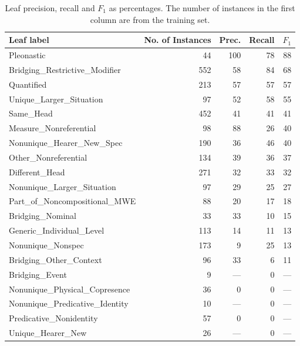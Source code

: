 \documentclass[11pt,letterpaper]{article}
\begin{document}
\begin{table*}\small\centering
   \begin{tabular}{lr<{\hspace{23pt}}r<{\hspace{3pt}}r<{\hspace{5pt}}r}
      \textbf{Leaf label} & \multicolumn{1}{c}{\textbf{No. of Instances}} & \multicolumn{1}{c}{\textbf{Prec.}} & \multicolumn{1}{c}{\textbf{Recall}} & \textbf{$F_1$} \\
      \midrule
Pleonastic & 44 & 100 & 78 & 88 \\
Bridging\_Restrictive\_Modifier & 552 & 58 & 84 & 68 \\
Quantified & 213 & 57 & 57 & 57 \\
Unique\_Larger\_Situation & 97 & 52 & 58 & 55 \\
Same\_Head & 452 & 41 & 41 & 41 \\
Measure\_Nonreferential & 98 & 88 & 26 & 40 \\
Nonunique\_Hearer\_New\_Spec & 190 & 36 & 46 & 40 \\
Other\_Nonreferential & 134 & 39 & 36 & 37 \\
Different\_Head & 271 & 32 & 33 & 32 \\
Nonunique\_Larger\_Situation & 97 & 29 & 25 & 27 \\
Part\_of\_Noncompositional\_MWE & 88 & 20 & 17 & 18 \\
Bridging\_Nominal & 33 & 33 & 10 & 15 \\
Generic\_Individual\_Level & 113 & 14 & 11 & 13 \\
Nonunique\_Nonspec & 173 & 9 & 25 & 13 \\
Bridging\_Other\_Context & 96 & 33 & 6 & 11 \\
Bridging\_Event & 9 & --- & 0 & --- \\
Nonunique\_Physical\_Copresence & 36 & 0 & 0 & --- \\
Nonunique\_Predicative\_Identity & 10 & --- & 0 & --- \\
Predicative\_Nonidentity & 57 & 0 & 0 & --- \\
Unique\_Hearer\_New & 26 & --- & 0 & --- \\
   \end{tabular}
   \caption{Leaf precision, recall and $F_1$ as percentages. 
The number of instances in the first column are from the training set.}
   \label{tbl:leaf}
\end{table*}
\end{document}
